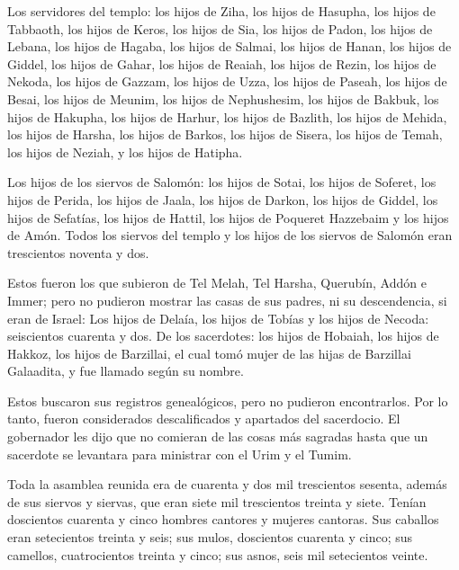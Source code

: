 \begin{paracol}{2}
 Los servidores del templo: los hijos de Ziha, los hijos
de Hasupha, los hijos de Tabbaoth,  los hijos de Keros,
los hijos de Sia, los hijos de Padon,  los hijos de
Lebana, los hijos de Hagaba, los hijos de Salmai,  los
hijos de Hanan, los hijos de Giddel, los hijos de Gahar, 
los hijos de Reaiah, los hijos de Rezin, los hijos de Nekoda,
 los hijos de Gazzam, los hijos de Uzza, los hijos de
Paseah,  los hijos de Besai, los hijos de Meunim, los
hijos de Nephushesim,  los hijos de Bakbuk, los hijos de
Hakupha, los hijos de Harhur,  los hijos de Bazlith, los
hijos de Mehida, los hijos de Harsha,  los hijos de
Barkos, los hijos de Sisera, los hijos de Temah,  los
hijos de Neziah, y los hijos de Hatipha.

 Los hijos de los siervos de Salomón: los hijos de Sotai,
los hijos de Soferet, los hijos de Perida,  los hijos de
Jaala, los hijos de Darkon, los hijos de Giddel,  los
hijos de Sefatías, los hijos de Hattil, los hijos de Poqueret Hazzebaim
y los hijos de Amón.  Todos los siervos del templo y los
hijos de los siervos de Salomón eran trescientos noventa y dos.

 Estos fueron los que subieron de Tel Melah, Tel Harsha,
Querubín, Addón e Immer; pero no pudieron mostrar las casas de sus
padres, ni su descendencia, si eran de Israel:  Los hijos
de Delaía, los hijos de Tobías y los hijos de Necoda: seiscientos
cuarenta y dos.  De los sacerdotes: los hijos de Hobaiah,
los hijos de Hakkoz, los hijos de Barzillai, el cual tomó mujer de las
hijas de Barzillai Galaadita, y fue llamado según su nombre.

 Estos buscaron sus registros genealógicos, pero no
pudieron encontrarlos. Por lo tanto, fueron considerados descalificados
y apartados del sacerdocio.  El gobernador les dijo que
no comieran de las cosas más sagradas hasta que un sacerdote se
levantara para ministrar con el Urim y el Tumim.

 Toda la asamblea reunida era de cuarenta y dos mil
trescientos sesenta,  además de sus siervos y siervas,
que eran siete mil trescientos treinta y siete. Tenían doscientos
cuarenta y cinco hombres cantores y mujeres cantoras. 
Sus caballos eran setecientos treinta y seis; sus mulos, doscientos
cuarenta y cinco;  sus camellos, cuatrocientos treinta y
cinco; sus asnos, seis mil setecientos veinte.


\end{paracol}
